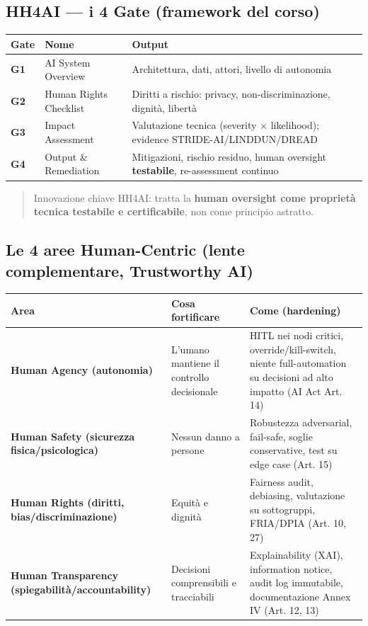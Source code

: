 \documentclass[11pt, a4paper]{article}
\begin{document}
\subsection{HH4AI — i 4 Gate (framework del corso)}

\noindent
\begin{tabularx}{\textwidth}{|l|l|X|}
\hline
\textbf{Gate} & \textbf{Nome} & \textbf{Output} \\ \hline
\textbf{G1} & AI System Overview & Architettura, dati, attori, livello di autonomia \\ \hline
\textbf{G2} & Human Rights Checklist & Diritti a rischio: privacy, non-discriminazione, dignità, libertà \\ \hline
\textbf{G3} & Impact Assessment & Valutazione tecnica (severity $\times$ likelihood); evidence STRIDE-AI/LINDDUN/DREAD \\ \hline
\textbf{G4} & Output \& Remediation & Mitigazioni, rischio residuo, human oversight \textbf{testabile}, re-assessment continuo \\ \hline
\end{tabularx}

\begin{quote}
Innovazione chiave HH4AI: tratta la \textbf{human oversight come proprietà tecnica testabile e certificabile}, non come principio astratto.
\end{quote}

\subsection{Le 4 aree Human-Centric (lente complementare, Trustworthy AI)}

\noindent
\begin{tabularx}{\textwidth}{|>{\bfseries}l|X|X|}
\hline
Area & \textbf{Cosa fortificare} & \textbf{Come (hardening)} \\ \hline
Human Agency (autonomia) & L'umano mantiene il controllo decisionale & HITL nei nodi critici, override/kill-switch, niente full-automation su decisioni ad alto impatto (AI Act Art. 14) \\ \hline
Human Safety (sicurezza fisica/psicologica) & Nessun danno a persone & Robustezza adversarial, fail-safe, soglie conservative, test su edge case (Art. 15) \\ \hline
Human Rights (diritti, bias/discriminazione) & Equità e dignità & Fairness audit, debiasing, valutazione su sottogruppi, FRIA/DPIA (Art. 10, 27) \\ \hline
Human Transparency (spiegabilità/accountability) & Decisioni comprensibili e tracciabili & Explainability (XAI), information notice, audit log immutabile, documentazione Annex IV (Art. 12, 13) \\ \hline
\end{tabularx}
\end{document}
